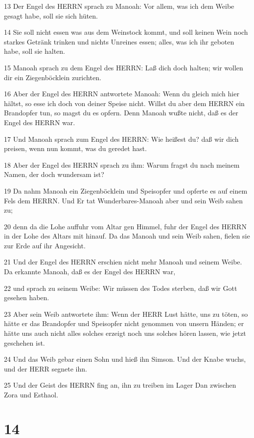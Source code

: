 \par 13 Der Engel des HERRN sprach zu Manoah: Vor allem, was ich dem Weibe gesagt habe, soll sie sich hüten.
\par 14 Sie soll nicht essen was aus dem Weinstock kommt, und soll keinen Wein noch starkes Getränk trinken und nichts Unreines essen; alles, was ich ihr geboten habe, soll sie halten.
\par 15 Manoah sprach zu dem Engel des HERRN: Laß dich doch halten; wir wollen dir ein Ziegenböcklein zurichten.
\par 16 Aber der Engel des HERRN antwortete Manoah: Wenn du gleich mich hier hältst, so esse ich doch von deiner Speise nicht. Willst du aber dem HERRN ein Brandopfer tun, so magst du es opfern. Denn Manoah wußte nicht, daß es der Engel des HERRN war.
\par 17 Und Manoah sprach zum Engel des HERRN: Wie heißest du? daß wir dich preisen, wenn nun kommt, was du geredet hast.
\par 18 Aber der Engel des HERRN sprach zu ihm: Warum fragst du nach meinem Namen, der doch wundersam ist?
\par 19 Da nahm Manoah ein Ziegenböcklein und Speisopfer und opferte es auf einem Fels dem HERRN. Und Er tat Wunderbares-Manoah aber und sein Weib sahen zu;
\par 20 denn da die Lohe auffuhr vom Altar gen Himmel, fuhr der Engel des HERRN in der Lohe des Altars mit hinauf. Da das Manoah und sein Weib sahen, fielen sie zur Erde auf ihr Angesicht.
\par 21 Und der Engel des HERRN erschien nicht mehr Manoah und seinem Weibe. Da erkannte Manoah, daß es der Engel des HERRN war,
\par 22 und sprach zu seinem Weibe: Wir müssen des Todes sterben, daß wir Gott gesehen haben.
\par 23 Aber sein Weib antwortete ihm: Wenn der HERR Lust hätte, uns zu töten, so hätte er das Brandopfer und Speisopfer nicht genommen von unsern Händen; er hätte uns auch nicht alles solches erzeigt noch uns solches hören lassen, wie jetzt geschehen ist.
\par 24 Und das Weib gebar einen Sohn und hieß ihn Simson. Und der Knabe wuchs, und der HERR segnete ihn.
\par 25 Und der Geist des HERRN fing an, ihn zu treiben im Lager Dan zwischen Zora und Esthaol.

\chapter{14}

